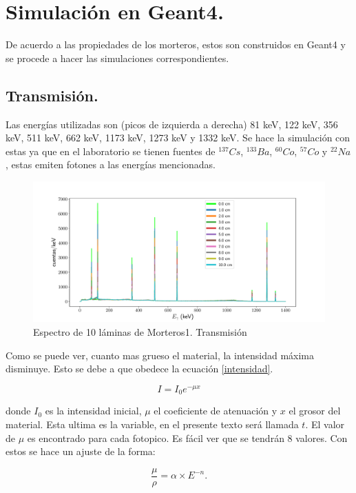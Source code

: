\chapter{Simulación en Geant4.}

De acuerdo a las propiedades de los morteros, estos son construidos en Geant4 y se procede a hacer las simulaciones correspondientes. 

\section{Transmisión.}

Las energías utilizadas son (picos de izquierda a derecha) 81 keV, 122 keV, 356 keV, 511 keV, 662 keV, 1173 keV, 1273 keV y 1332 keV. Se hace la simulación con estas ya que en el laboratorio se tienen fuentes de  $^{137}Cs$, $^{133}Ba$, $^{60}Co$, $^{57}Co$ y $^{22}Na$, estas emiten fotones a las energías mencionadas.
  
\begin{figure}[H]
	\centering
	\includegraphics[width=0.8\linewidth]{Kap4/espectro_m1-10M-trans.pdf}
	\caption{Espectro de 10 láminas de Morteros1. Transmisión}
	\label{fig:espectrom1-10m-trans}
\end{figure}


Como se puede ver, cuanto mas grueso el material, la intensidad máxima disminuye. Esto se debe a que obedece la ecuación \ref{intensidad}. 

\begin{equation}\label{intensidad}
    I=I_0e^{-\mu x}
\end{equation}


donde $I_0$ es la intensidad inicial, $\mu$ el coeficiente de atenuación y $x$ el grosor del material. Esta ultima es la variable, en el presente texto será llamada $t$. El valor de $\mu$ es encontrado para cada fotopico. Es fácil ver que se tendrán 8 valores. Con estos se hace un ajuste de la forma:

\begin{equation}
	\frac{\mu}{\rho}=\alpha\times E^{-n}.
\end{equation}

